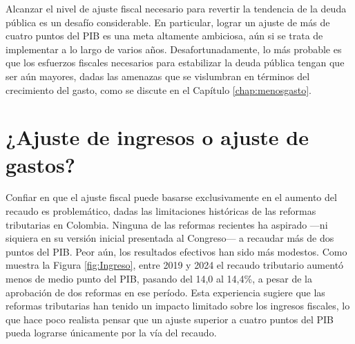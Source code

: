 Alcanzar el nivel de ajuste fiscal necesario para revertir la tendencia de la deuda pública es un desafío considerable. En particular, lograr un ajuste de más de cuatro puntos del PIB es una meta altamente ambiciosa, aún si se trata de implementar a lo largo de varios años. Desafortunadamente, lo más probable es que los esfuerzos fiscales necesarios para estabilizar la deuda pública tengan que ser aún mayores, dadas las amenazas que se vislumbran en términos del crecimiento del gasto, como se discute en el Capítulo \ref{chap:menosgasto}.


%


\section{¿Ajuste de ingresos o ajuste de gastos?}

Confiar en que el ajuste fiscal puede basarse exclusivamente en el aumento del recaudo es problemático, dadas las limitaciones históricas de las reformas tributarias en Colombia. Ninguna de las reformas recientes ha aspirado —ni siquiera en su versión inicial presentada al Congreso— a recaudar más de dos puntos del PIB. Peor aún, los resultados efectivos han sido más modestos. Como muestra la Figura \ref{fig:Ingreso}, entre 2019 y 2024 el recaudo tributario aumentó menos de medio punto del PIB, pasando del 14,0 al 14,4\%, a pesar de la aprobación de dos reformas en ese período. Esta experiencia sugiere que las reformas tributarias han tenido un impacto limitado sobre los ingresos fiscales, lo que hace poco realista pensar que un ajuste superior a cuatro puntos del PIB pueda lograrse únicamente por la vía del recaudo.


